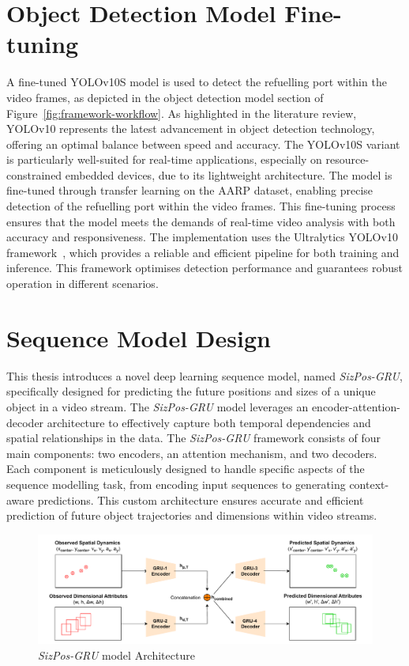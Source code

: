 \documentclass[12pt,oneside]{book} %
\begin{document}
\section{Object Detection Model Fine-tuning}
A fine-tuned YOLOv10S model is used to detect the refuelling port within the
video frames, as depicted in the object detection model section of
Figure~\ref{fig:framework-workflow}. As highlighted in the literature review,
YOLOv10 represents the latest advancement in object detection technology,
offering an optimal balance between speed and accuracy. The YOLOv10S variant is
particularly well-suited for real-time applications, especially on
resource-constrained embedded devices, due to its lightweight architecture. The
model is fine-tuned through transfer learning on the AARP dataset, enabling
precise detection of the refuelling port within the video frames. This
fine-tuning process ensures that the model meets the demands of real-time video
analysis with both accuracy and responsiveness. The implementation uses the
Ultralytics YOLOv10 framework~\cite{Jocher_Ultralytics_YOLO_2023}, which
provides a reliable and efficient pipeline for both training and inference.
This framework optimises detection performance and guarantees robust operation
in different scenarios.

\section{Sequence Model Design}

This thesis introduces a novel deep learning sequence model, named
\textit{SizPos-GRU}, specifically designed for predicting the future positions
and sizes of a unique object in a video stream. The \textit{SizPos-GRU} model
leverages an encoder-attention-decoder architecture to effectively capture both
temporal dependencies and spatial relationships in the data. The
\textit{SizPos-GRU} framework consists of four main components: two encoders,
an attention mechanism, and two decoders. Each component is meticulously
designed to handle specific aspects of the sequence modelling task, from
encoding input sequences to generating context-aware predictions. This custom
architecture ensures accurate and efficient prediction of future object
trajectories and dimensions within video streams.

\begin{figure}[H]
    \centering
    \includegraphics[width=1\textwidth]{figures/GRUSizPos.drawio.pdf}
    \caption{\textit{SizPos-GRU} model Architecture}\label{fig:sizpos-gru}
\end{figure}
\end{document}

